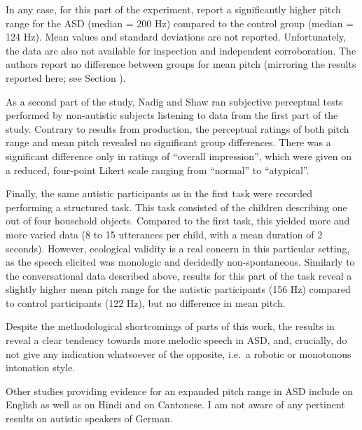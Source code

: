 In any case, for this part of the experiment, \citet{nadigAcousticPerceptualMeasurement2012} report a significantly higher pitch range for the ASD (median = 200 Hz) compared to the control group (median = 124 Hz). Mean values and standard deviations are not reported. Unfortunately, the data are also not available for inspection and independent corroboration. The authors report no difference between groups for mean pitch (mirroring the results reported here; see Section ).

As a second part of the study, Nadig and Shaw ran subjective perceptual tests performed by non-autistic subjects listening to data from the first part of the study. Contrary to results from production, the perceptual ratings of both pitch range and mean pitch revealed no significant group differences. There was a significant difference only in ratings of ``overall impression'', which were given on a reduced, four-point Likert scale ranging from ``normal'' to ``atypical''.

Finally, the same autistic participants as in the first task were recorded performing a structured task. This task consisted of the children describing one out of four household objects. Compared to the first task, this yielded more and more varied data (8 to 15 utterances per child, with a mean duration of 2 seconds). However, ecological validity is a real concern in this particular setting, as the speech elicited was monologic and decidedly non-spontaneous. Similarly to the conversational data described above, results for this part of the task reveal a slightly higher mean pitch range for the autistic participants (156 Hz) compared to control participants (122 Hz), but no difference in mean pitch.

Despite the methodological shortcomings of parts of this work, the results in \citet{nadigAcousticPerceptualMeasurement2012} reveal a clear tendency towards more melodic speech in ASD, and, crucially, do not give any indication whatsoever of the opposite, i.e.~a robotic or monotonous intonation style.

Other studies providing evidence for an expanded pitch range in ASD include \citet{fosnotProsodicCharacteristicsChildren1999,edelsonEmotionalProsodyChildren2007,hubbardIntonationEmotionAutistic2007,diehlAcousticAnalysisProsody2009} on English as well as \citet{shardaSoundsMelodyPitch2010} on Hindi and \citet{chanIndividualsHighfunctioningAutism2016} on Cantonese. I am not aware of any pertinent results on autistic speakers of German.

